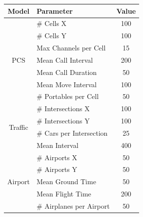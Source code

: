 \documentclass[11pt]{book}
\begin{document}
\begin{figure}
    \begin{center}
        \begin{tabular}{|| c | l | c ||}
            \hline
            Model & Parameter & Value \\ [0.5ex]
            \hline\hline
            \multirow{7}{*}{PCS}
                & \# Cells X            & 100   \\
                & \# Cells Y            & 100   \\
                & Max Channels per Cell & 15    \\
                & Mean Call Interval    & 200   \\
                & Mean Call Duration    & 50    \\
                & Mean Move Interval    & 100   \\
                & \# Portables per Cell & 50    \\ [0.5ex]
            \hline\hline
            \multirow{4}{*}{Traffic}
                & \# Intersections X        & 100   \\
                & \# Intersections Y        & 100   \\
                & \# Cars per Intersection  & 25    \\
                & Mean Interval             & 400   \\ [0.5ex]
            \hline\hline
            \multirow{5}{*}{Airport}
                & \# Airports X             & 50    \\
                & \# Airports Y             & 50    \\
                & Mean Ground Time          & 50    \\
                & Mean Flight Time          & 200   \\
                & \# Airplanes per Airport  & 50    \\
            \hline
        \end{tabular}
    \end{center}
\end{figure}
\end{document}
